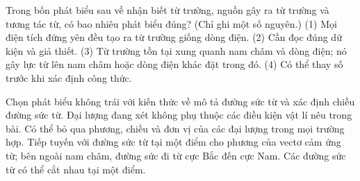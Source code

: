 \begin{ex}
Trong bốn phát biểu sau về nhận biết từ trường, nguồn gây ra từ trường và tương tác từ, có bao nhiêu phát biểu đúng? (Chỉ ghi một số nguyên.) (1) Mọi điện tích đứng yên đều tạo ra từ trường giống dòng điện. (2) Cần đọc đúng dữ kiện và giả thiết. (3) Từ trường tồn tại xung quanh nam châm và dòng điện; nó gây lực từ lên nam châm hoặc dòng điện khác đặt trong đó. (4) Có thể thay số trước khi xác định công thức.
\end{ex}

\begin{ex}
Chọn phát biểu không trái với kiến thức về mô tả đường sức từ và xác định chiều đường sức từ.
\choice
{Đại lượng đang xét không phụ thuộc các điều kiện vật lí nêu trong bài.}
{Có thể bỏ qua phương, chiều và đơn vị của các đại lượng trong mọi trường hợp.}
{\True Tiếp tuyến với đường sức từ tại một điểm cho phương của vectơ cảm ứng từ; bên ngoài nam châm, đường sức đi từ cực Bắc đến cực Nam.}
{Các đường sức từ có thể cắt nhau tại một điểm.}
\end{ex}


